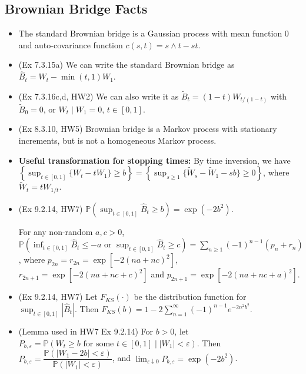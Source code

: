 \documentclass[twoside]{article}
\newcommand{\dis}{\displaystyle}
\newcommand\bbP{\mathbb{P}}
\def\eps{\varepsilon}
\begin{document}
\subsection*{Brownian Bridge Facts}
\begin{itemize}
\item The standard Brownian bridge is a Gaussian process with mean function 0 and auto-covariance function $c(s, t) = s \wedge t - st$.

\item (Ex 7.3.15a) We can write the standard Brownian bridge as $\widehat{B}_t = W_t - \min (t, 1) W_1$.

\item (Ex 7.3.16c,d, HW2) We can also write it as $\widetilde{B}_t = (1-t)W_{t/(1-t)}$ with $\widetilde{B}_0 = 0$, or $W_t \mid W_1 = 0$, $t \in [0,1]$.

\item (Ex 8.3.10, HW5) Brownian bridge is a Markov process with stationary increments, but is not a homogeneous Markov process.

\item \textbf{Useful transformation for stopping times:} By time inversion, we have $\left\{ \dis\sup_{t \in [0,1]} \{ W_t - tW_1 \} \geq b \right\} = \left\{ \dis\sup_{s \geq 1} \{ \widetilde{W}_s - \widetilde{W}_1 - sb \} \geq 0 \right\}$, where $\widetilde{W}_t = t W_{1/t}$.

\item (Ex 9.2.14, HW7) $\bbP \left( \dis\sup_{t \in [0,1]} \widehat{B}_t \geq b \right) = \exp (-2b^2)$.

For any non-random $a,c > 0$, $\bbP \left( \dis\inf_{t \in [0,1]}\widehat{B}_t \leq -a \text{ or } \dis\sup_{t \in [0,1]}\widehat{B}_t \geq c \right) = \dis\sum_{n \geq 1} (-1)^{n-1} (p_n + r_n)$, where $p_{2n} = r_{2n} = \exp [-2(na+nc)^2]$, $r_{2n+1} = \exp [-2(na+nc+c)^2]$ and $p_{2n+1} = \exp [-2(na+nc+a)^2]$.

\item (Ex 9.2.14, HW7) Let $F_{KS}(\cdot)$ be the distribution function for $\dis\sup_{t \in [0,1]} |\widehat{B}_t|$. Then $F_{KS}(b) = 1 - 2 \dis\sum_{n=1}^\infty (-1)^{n-1}e^{-2n^2 b^2}$.

\item (Lemma used in HW7 Ex 9.2.14) For $b > 0$, let $P_{b, \eps} = \bbP (W_t \geq b \text{ for some } t \in [0,1] \mid |W_1| < \eps)$. Then $P_{b,\eps} = \dfrac{\bbP(|W_1 - 2b| < \eps)}{\bbP(|W_1| < \eps)}$, and $\dis\lim_{\eps \downarrow 0} P_{b, \eps} = \exp(-2b^2)$.

\end{itemize}
\end{document}
